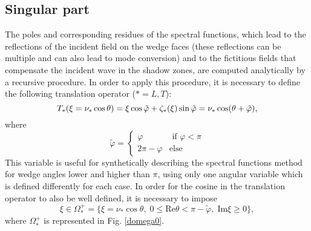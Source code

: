 \subsection{Singular part}
\label{singpart}
The poles and corresponding residues of the spectral functions, which lead to the reflections of the incident field on the wedge faces (these reflections can be multiple and can also lead to mode conversion) and to the fictitious fields that compensate the incident wave in the shadow zones, are computed analytically by a recursive procedure. In order to apply this procedure, it is necessary to define the following translation operator ($*=L,T$):
\begin{equation}
T_*(\xi=\nu_*\cos\theta)=\xi \cos \tilde{\varphi}+\zeta_*(\xi)\sin\tilde{\varphi}=\nu_*\cos(\theta+\tilde{\varphi}),
\end{equation}
where
\begin{equation}
\tilde{\varphi}=
\left\{
\begin{matrix}
\varphi & \mbox{ if } \varphi < \pi \\
2\pi-\varphi & \mbox{else}
\end{matrix}
\right.
\label{phitilde}
\end{equation}
This variable is useful for synthetically describing the spectral functions method for wedge angles lower and higher than $\pi$, using only one angular variable which is defined differently for each case. In order for the cosine in the translation operator to also be well defined, it is necessary to impose
\begin{equation}
\xi \in \Omega_*^+= \{ \xi=\nu_* \cos \theta, \; 0 \leq \mbox{Re} \theta < \pi-\tilde{\varphi}, \; \mbox{Im}\xi\geq0 \},
\label{defOmega0}
\end{equation}
where $\Omega_*^+$ is represented in Fig. \ref{domega0}.

